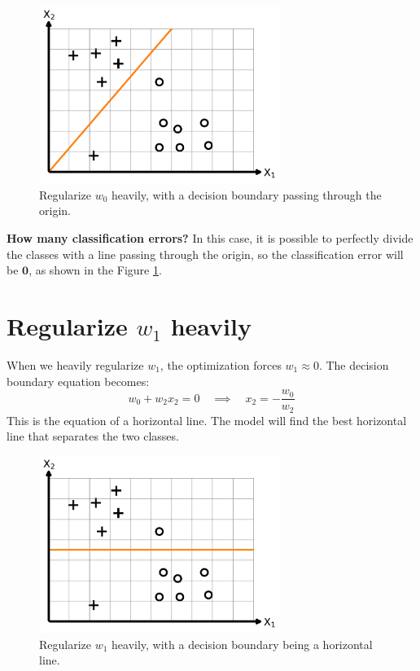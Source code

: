 \documentclass[11pt, a4paper, oneside]{memoir}
\begin{document}
\begin{figure}[H]
    \centering
    \includegraphics[width=0.7\textwidth]{code/result/problem6_2.pdf}
    \caption{Regularize $w_0$ heavily, with a decision boundary passing through the origin.}
    \label{fig:problem6_2}
\end{figure}

\textbf{How many classification errors?} In this case, it is possible to perfectly divide the classes
with a line passing through the origin, so the classification error will be $\textbf{0}$, as shown in the Figure \ref{fig:problem6_2}.

\section[Regularize w1 heavily]{Regularize $w_1$ heavily}
When we heavily regularize $w_1$, the optimization forces $w_1 \approx 0$. The decision boundary equation becomes:
\[ w_0 + w_2x_2 = 0 \quad \implies \quad x_2 = -\frac{w_0}{w_2} \]
This is the equation of a horizontal line. The model will find the best horizontal line that separates the two classes.

\begin{figure}[H]
    \centering
    \includegraphics[width=0.7\textwidth]{code/result/problem6_3.pdf}
    \caption{Regularize $w_1$ heavily, with a decision boundary being a horizontal line.}
    \label{fig:problem6_3}
\end{figure}
\end{document}
